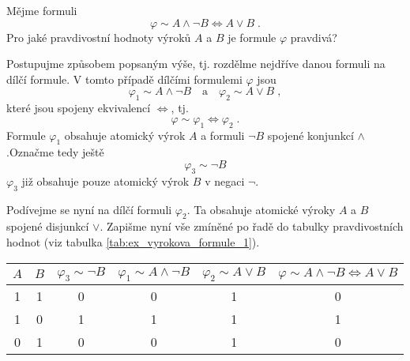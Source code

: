 \begin{example}\label{ex:vyrokova_formule_1}
    Mějme formuli
    \begin{equation*}
        \varphi\sim A \land \neg B \iff A \lor B\; .
    \end{equation*}
    Pro jaké pravdivostní hodnoty výroků $A$ a $B$ je formule $\varphi$ pravdivá?
    \begin{solution}
        Postupujme způsobem popsaným výše, tj. rozdělme nejdříve danou formuli na dílčí formule. V tomto případě dílčími formulemi $\varphi$ jsou
        \begin{equation*}
            \varphi_1\sim A \land \neg B \quad \text{a} \quad \varphi_2\sim A \lor B\; ,
        \end{equation*}
        které jsou spojeny ekvivalencí $\iff$, tj.
        \begin{equation*}
            \varphi\sim \varphi_1 \iff \varphi_2\; .
        \end{equation*}
        Formule $\varphi_1$ obsahuje atomický výrok $A$ a formuli $\neg B$ spojené konjunkcí $\land$.\linebreak Označme tedy ještě
        \begin{equation*}
            \varphi_3\sim \neg B
        \end{equation*}
        $\varphi_3$ již obsahuje pouze atomický výrok $B$ v negaci $\neg$.\par
        Podívejme se nyní na dílčí formuli $\varphi_2$. Ta obsahuje atomické výroky $A$ a $B$ spojené disjunkcí $\lor$. Zapišme nyní vše zmíněné po řadě do tabulky pravdivostních hodnot (viz tabulka \ref{tab:ex_vyrokova_formule_1}).\par
        \begin{table}[h]
            \centering
            \begin{tabular}{|cc|cccc|}
            \hline
            $A$ & $B$ & $\varphi_3\sim \neg B$ & $\varphi_1\sim A \land \neg B$ & $\varphi_2\sim A \lor B$ & $\varphi\sim A \land \neg B \iff A \lor B$ \\ \hline
            1   & 1   & 0               & 0                          & 1                    & 0                                          \\
            1   & 0   & 1               & 1                          & 1                    & 1                                          \\
            0   & 1   & 0               & 0                          & 1                    & 0                                          \\

\end{tabular}
\end{table}
\end{solution}
\end{example}
